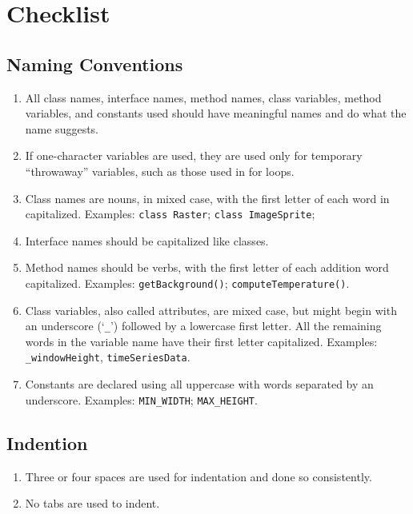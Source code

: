 \chapter{Checklist}

\section*{Naming Conventions}
\begin{enumerate}
\item All class names, interface names, method names, class variables, method variables, and constants used should have meaningful names and do what the name suggests.
\item If one-character variables are used, they are used only for temporary ``throwaway'' variables, such as those used in for loops.
\item Class names are nouns, in mixed case, with the first letter of each word in capitalized. Examples: \texttt{class Raster}; \texttt{class ImageSprite};
\item Interface names should be capitalized like classes.
\item Method names should be verbs, with the first letter of each addition word capitalized. Examples: \texttt{getBackground()}; \texttt{computeTemperature()}.
\item Class variables, also called attributes, are mixed case, but might begin with an underscore (`\texttt{\_}') followed by a lowercase first letter. All the remaining words in the variable name have their first letter capitalized. Examples: \texttt{\_windowHeight}, \texttt{timeSeriesData}.
\item Constants are declared using all uppercase with words separated by an underscore. Examples: \texttt{MIN\_WIDTH}; \texttt{MAX\_HEIGHT}.
\end{enumerate}

\section*{Indention}\begin{enumerate}[resume]
\item Three or four spaces are used for indentation and done so consistently.
\item No tabs are used to indent.
\end{enumerate}

